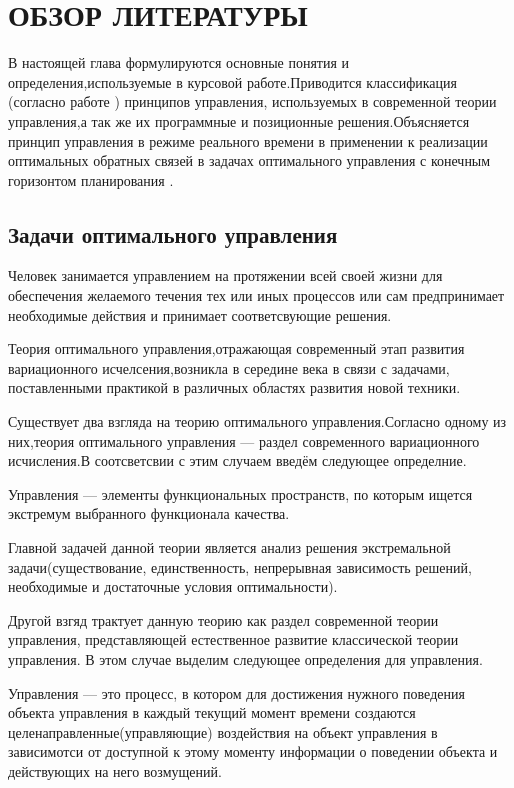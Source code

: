 \chapter{ОБЗОР ЛИТЕРАТУРЫ}\label{chap1}


В настоящей глава формулируются основные понятия и определения,используемые в курсовой работе.Приводится классификация (согласно работе \cite{GabasovKirillovaPU}) принципов управления, используемых в современной теории управления,а так же их программные и позиционные решения.Объясняется принцип управления в режиме реального времени в применении к реализации оптимальных обратных связей в задачах оптимального управления с конечным горизонтом планирования \cite{GabasovDmitrukKirillova15a}.


\section{Задачи оптимального управления}\label{1sec:optimal-control}
Человек занимается управлением на протяжении всей своей жизни для обеспечения желаемого течения тех или иных процессов или сам предпринимает необходимые действия и принимает соответсвующие решения.

Теория оптимального управления,отражающая современный этап развития вариационного исчелсения,возникла в середине  века в связи с задачами, поставленными практикой в различных областях развития новой техники.

Существует два взгляда на теорию оптимального управления.Согласно одному из них,теория оптимального управления — раздел современного вариационного исчисления.В соотсветсвии с этим случаем введём следующее определние.
\begin{definition} Управления — элементы функциональных пространств, по которым ищется экстремум выбранного функционала качества.
\end{definition}
Главной задачей данной теории является анализ решения экстремальной задачи(существование, единственность, непрерывная зависимость решений, необходимые и достаточные условия оптимальности).

Другой взгяд трактует данную теорию как раздел современной теории управления, представляющей естественное развитие классической теории управления.
В этом случае выделим следующее определения для управления.
\begin{definition} Управления — это процесс, в котором для достижения нужного поведения объекта управления в каждый текущий момент времени создаются целенаправленные(управляющие) воздействия на объект управления в зависимотси от доступной к этому моменту информации о поведении объекта и действующих на него возмущений.
\end{definition}

